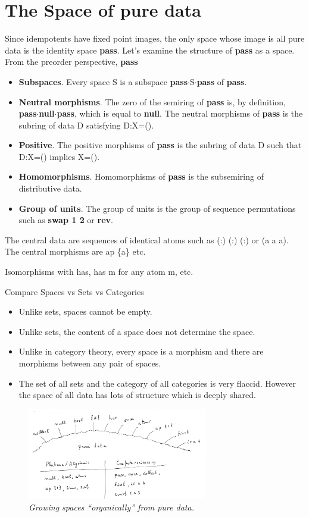 \documentclass[11pt]{article}
\begin{document}
\section{The Space of pure data} 

     Since idempotents have fixed point images, the only space whose image is all pure data is the identity space {\bf pass}.  Let's examine the structure of {\bf pass} as a space.  From the preorder 
 perspective, {\bf pass}
 \begin{itemize}
 \item{{\bf Subspaces}. Every space S is a subspace {\bf pass}$\cdot$S$\cdot${\bf pass} of {\bf pass}.}
 \item{{\bf Neutral morphisms}. The zero of the semiring of {\bf pass} is, by definition, {\bf pass}$\cdot${\bf null}$\cdot${\bf pass}, which 
 is equal to {\bf null}.  The neutral morphisms of {\bf pass} is the subring of data D satisfying D:X=(). }
 \item{{\bf Positive}. The positive morphisms of {\bf pass} is the subring of data D such that D:X=() implies X=().}
 \item{{\bf Homomorphisms}.  Homomorphisms of {\bf pass} is the subsemiring of distributive data}.
 \item{{\bf Group of units}.  The group of units is the group of sequence permutations such as {\bf swap 1 2} or {\bf rev}.}
 \end{itemize}

The central data are sequences of identical atoms such as (:) (:) (:) or (a a a).  The central morphisms are ap \{a\} etc.  

Isomorphisms with has, has m for any atom m, etc. 

Compare Spaces vs Sets vs Categories 
\begin{itemize}
\item{Unlike sets, spaces cannot be empty.}
\item{Unlike sets, the content of a space does not determine the space.}
\item{Unlike in category theory, every space is a morphism and there are morphisms between any pair of spaces.}  
\item{The set of all sets and the category of all categories is very flaccid.  However the space of all data has lots of structure which is deeply shared.}
\end{itemize}


\begin{figure}[h]
\centering
\includegraphics[width=0.7\textwidth]{garden.png}
\caption{{\it Growing spaces ``organically'' from pure data.}}
\end{figure}
\end{document}
